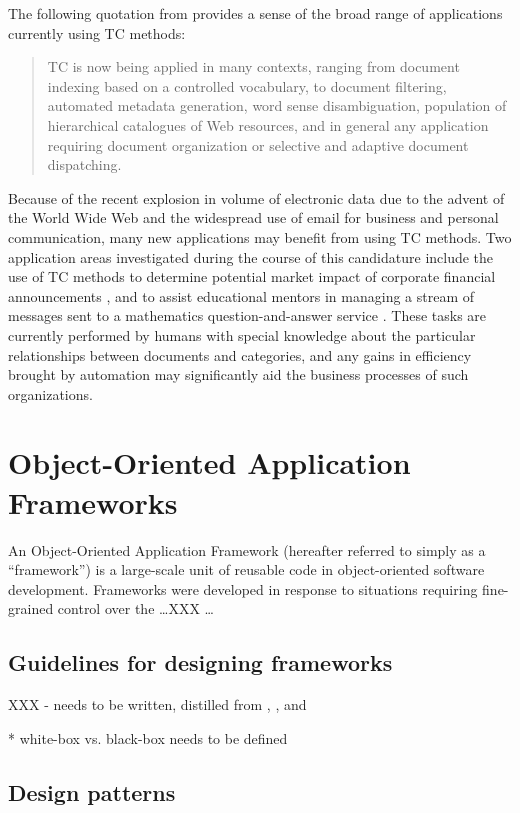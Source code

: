 The following quotation from \cite{sebastiani:02} provides a sense of
the broad range of applications currently using TC methods:

\begin{quote}
TC is now being applied in many contexts, ranging from document
indexing based on a controlled vocabulary, to document filtering,
automated metadata generation, word sense disambiguation, population
of hierarchical catalogues of Web resources, and in general any
application requiring document organization or selective and adaptive
document dispatching.
\end{quote}

Because of the recent explosion in volume of electronic data due to
the advent of the World Wide Web and the widespread use of email for
business and personal communication, many new applications may benefit
from using TC methods.  Two application areas investigated during the
course of this candidature include the use of TC methods to determine
potential market impact of corporate financial announcements
\cite{calvo:02}, and to assist educational mentors in managing a
stream of messages sent to a mathematics question-and-answer service
\cite{williams:02}.  These tasks are currently performed by humans
with special knowledge about the particular relationships between
documents and categories, and any gains in efficiency brought by
automation may significantly aid the business processes of such
organizations.

\section{Object-Oriented Application Frameworks}

An Object-Oriented Application Framework (hereafter referred to simply
as a ``framework'') is a large-scale unit of reusable code in
object-oriented
software development.  Frameworks were developed in response to
situations requiring fine-grained control over the \ldots XXX \ldots

\subsection{Guidelines for designing frameworks}

XXX - needs to be written, distilled from \cite{fayad:99},
\cite{johnson:97}, and \cite{fayad:97}

 * white-box vs. black-box needs to be defined

\subsection{Design patterns}
\label{patterns}

